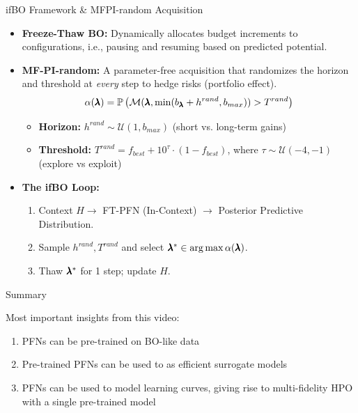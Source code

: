 \documentclass[main]{subfiles}
\begin{document}

\begin{frame}{ifBO Framework \& MFPI-random Acquisition\\ }

    \begin{itemize}
        \item 
    \textbf{Freeze-Thaw BO:} Dynamically allocates budget increments to configurations, i.e., pausing and resuming based on predicted potential.
        \item \textbf{MF-PI-random:} A parameter-free acquisition that randomizes the horizon and threshold at \textit{every} step to hedge risks (portfolio effect).
        $$ \alpha(\pmb{\lambda}) = \mathbb{P}\left( \mathcal{M}(\pmb{\lambda}, \min(b_{\pmb{\lambda}} + h^{rand}, b_{max})) > T^{rand} \right) $$
        \begin{itemize}
            \item \textbf{Horizon:} $h^{rand} \sim \mathcal{U}(1, b_{max})$ (short vs. long-term gains)
            \item \textbf{Threshold:} $T^{rand} = f_{best} + 10^{\tau} \cdot (1 - f_{best})$, where $\tau \sim \mathcal{U}(-4, -1)$ (explore vs exploit)
        \end{itemize}

        \item \textbf{The ifBO Loop:} 
        \begin{enumerate}
            \item Context $H \to$ FT-PFN (In-Context) $\to$ Posterior Predictive Distribution. 
            \item Sample $h^{rand}, T^{rand}$ and select $\pmb{\lambda}^* \in \arg\max \alpha(\pmb{\lambda})$. 
            \item Thaw $\pmb{\lambda}^*$ for 1 step; update $H$.
        \end{enumerate}
    \end{itemize}
\end{frame}
\begin{frame}{Summary} 

Most important insights from this video:

\begin{enumerate}
    \item PFNs can be pre-trained on BO-like data
    \item Pre-trained PFNs can be used to as efficient surrogate models
    \item PFNs can be used to model learning curves, giving rise to multi-fidelity HPO with a single pre-trained model
\end{enumerate}


\end{frame}
\end{document}
